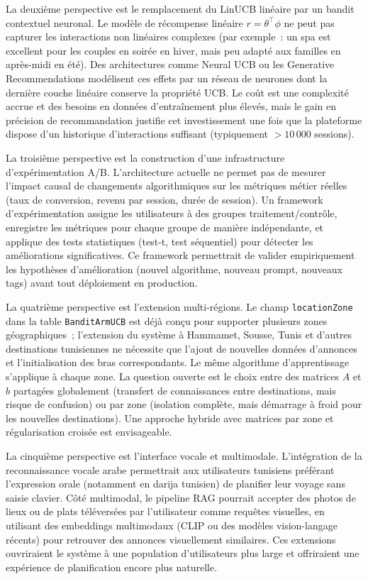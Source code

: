 La deuxième perspective est le remplacement du LinUCB linéaire par un bandit contextuel
neuronal. Le modèle de récompense linéaire $r = \theta^\top \phi$ ne peut pas capturer les
interactions non linéaires complexes (par exemple~: un spa est excellent pour les couples
en soirée en hiver, mais peu adapté aux familles en après-midi en été). Des architectures
comme Neural UCB ou les Generative Recommendations modélisent ces effets par un réseau de
neurones dont la dernière couche linéaire conserve la propriété UCB. Le coût est une
complexité accrue et des besoins en données d'entraînement plus élevés, mais le gain en
précision de recommandation justifie cet investissement une fois que la plateforme dispose
d'un historique d'interactions suffisant (typiquement $> 10\,000$ sessions).

La troisième perspective est la construction d'une infrastructure d'expérimentation A/B.
L'architecture actuelle ne permet pas de mesurer l'impact causal de changements
algorithmiques sur les métriques métier réelles (taux de conversion, revenu par session,
durée de session). Un framework d'expérimentation assigne les utilisateurs à des groupes
traitement/contrôle, enregistre les métriques pour chaque groupe de manière indépendante,
et applique des tests statistiques (test-t, test séquentiel) pour détecter les
améliorations significatives. Ce framework permettrait de valider empiriquement les
hypothèses d'amélioration (nouvel algorithme, nouveau prompt, nouveaux tags) avant tout
déploiement en production.

La quatrième perspective est l'extension multi-régions. Le champ \texttt{locationZone}
dans la table \texttt{BanditArmUCB} est déjà conçu pour supporter plusieurs zones
géographiques~; l'extension du système à Hammamet, Sousse, Tunis et d'autres destinations
tunisiennes ne nécessite que l'ajout de nouvelles données d'annonces et l'initialisation
des bras correspondants. Le même algorithme d'apprentissage s'applique à chaque zone. La
question ouverte est le choix entre des matrices $A$ et $b$ partagées globalement (transfert
de connaissances entre destinations, mais risque de confusion) ou par zone (isolation
complète, mais démarrage à froid pour les nouvelles destinations). Une approche hybride avec
matrices par zone et régularisation croisée est envisageable.

La cinquième perspective est l'interface vocale et multimodale. L'intégration de la
reconnaissance vocale arabe permettrait aux utilisateurs tunisiens préférant l'expression
orale (notamment en darija tunisien) de planifier leur voyage sans saisie clavier. Côté
multimodal, le pipeline RAG pourrait accepter des photos de lieux ou de plats téléversées
par l'utilisateur comme requêtes visuelles, en utilisant des embeddings multimodaux (CLIP
ou des modèles vision-langage récents) pour retrouver des annonces visuellement similaires.
Ces extensions ouvriraient le système à une population d'utilisateurs plus large et
offriraient une expérience de planification encore plus naturelle.


